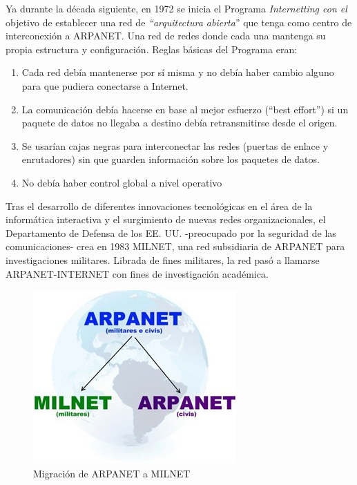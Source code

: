 \documentclass[
  letterpaper,
  DIV=11,
  numbers=noendperiod]{scrreprt}
\begin{document}
Ya durante la década siguiente, en 1972 se inicia el Programa
\emph{Internetting con el} objetivo de establecer una red de
\emph{``arquitectura abierta}'' que tenga como centro de interconexión a
ARPANET. Una red de redes donde cada una mantenga su propia estructura y
configuración. Reglas básicas del Programa eran:

\begin{enumerate}
\def\labelenumi{\arabic{enumi}.}
\item
  Cada red debía mantenerse por sí misma y no debía haber cambio alguno
  para que pudiera conectarse a Internet.
\item
  La comunicación debía hacerse en base al mejor esfuerzo (``best
  effort'') si un paquete de datos no llegaba a destino debía
  retransmitirse desde el origen.
\item
  Se usarían cajas negras para interconectar las redes (puertas de
  enlace y enrutadores) sin que guarden información sobre los paquetes
  de datos.
\item
  No debía haber control global a nivel operativo
\end{enumerate}

Tras el desarrollo de diferentes innovaciones tecnológicas en el área de
la informática interactiva y el surgimiento de nuevas redes
organizacionales, el Departamento de Defensa de los EE. UU. -preocupado
por la seguridad de las comunicaciones- crea en 1983 MILNET, una red
subsidiaria de ARPANET para investigaciones militares. Librada de fines
militares, la red pasó a llamarse ARPANET-INTERNET con fines de
investigación académica.

\begin{figure}[H]

{\centering \includegraphics{images_2_cap/6-ARPANET-MILNET.jpg}

}

\caption{Migración de ARPANET a MILNET}

\end{figure}%
\end{document}

